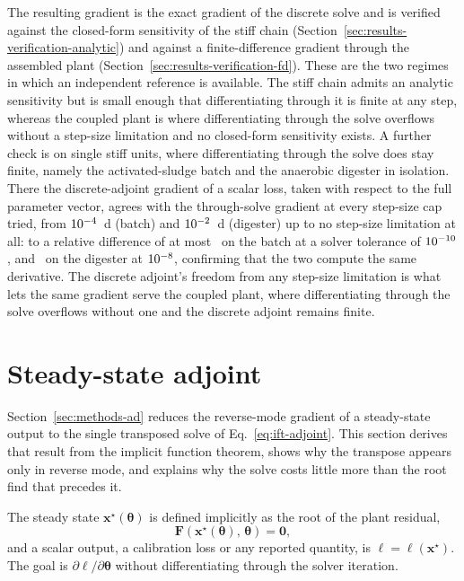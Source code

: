 \documentclass{article}
\begin{document}
The resulting gradient is the exact gradient of the discrete solve and is verified against the closed-form sensitivity of the stiff chain (Section~\ref{sec:results-verification-analytic}) and against a finite-difference gradient through the assembled plant (Section~\ref{sec:results-verification-fd}). These are the two regimes in which an independent reference is available. The stiff chain admits an analytic sensitivity but is small enough that differentiating through it is finite at any step, whereas the coupled plant is where differentiating through the solve overflows without a step-size limitation and no closed-form sensitivity exists. A further check is on single stiff units, where differentiating through the solve does stay finite, namely the activated-sludge batch and the anaerobic digester in isolation. There the discrete-adjoint gradient of a scalar loss, taken with respect to the full parameter vector, agrees with the through-solve gradient at every step-size cap tried, from \(10^{-4}\)~d (batch) and \(10^{-2}\)~d (digester) up to no step-size limitation at all: to a relative difference of at most \SIAdjBatchRel\ on the batch at a solver tolerance of \(10^{-10}\), and \SIAdjDigRel\ on the digester at \(10^{-8}\), confirming that the two compute the same derivative. The discrete adjoint's freedom from any step-size limitation is what lets the same gradient serve the coupled plant, where differentiating through the solve overflows without one and the discrete adjoint remains finite.

\section{Steady-state adjoint}
\label{si:steady-adjoint}
Section~\ref{sec:methods-ad} reduces the reverse-mode gradient of a steady-state output to the single transposed solve of Eq.~\eqref{eq:ift-adjoint}. This section derives that result from the implicit function theorem, shows why the transpose appears only in reverse mode, and explains why the solve costs little more than the root find that precedes it.

The steady state \(\mathbf{x}^\star(\boldsymbol{\theta})\) is defined implicitly as the root of the plant residual,
\[
\mathbf{F}\!\left(\mathbf{x}^\star(\boldsymbol{\theta}),\,\boldsymbol{\theta}\right)=\mathbf{0},
\]
and a scalar output, a calibration loss or any reported quantity, is \(\ell=\ell(\mathbf{x}^\star)\). The goal is \(\partial\ell/\partial\boldsymbol{\theta}\) without differentiating through the solver iteration.
\end{document}
